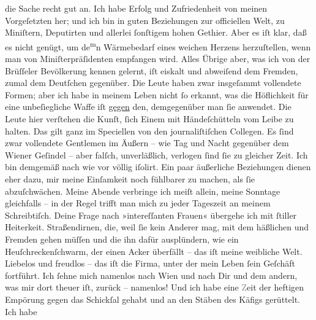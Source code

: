 \begin{ledgroupsized}[t]{13cm}
               die Sache recht gut an. Ich habe Erfolg und Zufriedenheit von meinen Vorgeſetzten
               her; und ich bin in guten Beziehungen zur officiellen Welt, zu Miniſtern, Deputirten
               und allerlei ſonſtigem hohen Gethier. Aber es iſt klar, daß \strikeout{\textcolor{gray}{d}} es nicht genügt, um de\substVorne{}\textsuperscript{m}\substDazwischen{}n\substHinten{} Wärmebedarf eines weichen Herzens herzuſtellen, wenn man von
               Miniſterpräſidenten empfangen wird. Alles Übrige aber, was ich von der Brüſſeler Bevölkerung kennen gelernt, iſt eiskalt
               und abweiſend dem Fremden, zumal dem Deutſchen gegenüber. Die Leute haben zwar  insgeſammt vollendete Formen; aber ich habe in
               meinem Leben nicht ſo erkannt, was die Höflichkeit für eine unbeſiegliche {\pb}Waffe iſt \uline{gegen} den,
               demgegenüber man ſie anwendet. Die Leute hier verſtehen die Kunſt, ſich Einem mit
               Händeſchütteln vom  Leibe zu halten. Das gilt
               ganz im Speciellen von den journaliſtiſchen Collegen. Es ſind zwar vollendete
               Gentlemen im Äußern – wie Tag und Nacht gegenüber dem Wiener Geſindel – aber falſch, unverläßlich, verlogen ſind ſie zu gleicher
               Zeit. Ich bin demgemäß nach wie vor völlig iſolirt. Ein paar äußerliche Beziehungen
               dienen eher dazu, mir meine Einſamkeit noch fühlbarer zu machen, als ſie
               abzuſchwächen. Meine Abende verbringe ich meiſt allein, meine Sonntage gleichfalls –
               in der Regel trifft man mich zu jeder Tageszeit an meinem Schreibtiſch. Deine Frage
               nach »intereſſanten Frauen« übergehe ich mit ſtiller Heiterkeit. Straßendirnen, die,
               weil ſie kein Anderer mag, mit dem häßlichen und \label{K_L02668-13v}\label{K_L02668-13h} Fremden gehen müſſen und die ihn dafür ausplündern, wie ein
               Heuſchreckenſchwarm, der einen Acker überfällt – das iſt meine {\pb}weibliche Welt. Liebelos und freudlos – das iſt die
               Firma, unter der mein Leben ſein Geſchäft fortführt. Ich ſehne mich namenlos nach Wien und nach Dir und dem andern, was mir dort
               theuer iſt, zurück – namenlos! Und ich habe eine \textcolor{gray}{Z}eit der heftigen
               Empörung gegen das Schickſal gehabt und an den Stäben des Käfigs gerüttelt. Ich habe

\end{ledgroupsized}
